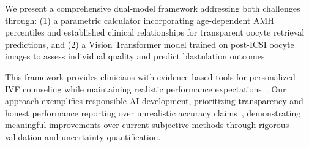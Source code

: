 We present a comprehensive dual-model framework addressing both challenges through: (1) a parametric calculator incorporating age-dependent AMH percentiles and established clinical relationships for transparent oocyte retrieval predictions, and (2) a Vision Transformer model trained on post-ICSI oocyte images to assess individual quality and predict blastulation outcomes.

This framework provides clinicians with evidence-based tools for personalized IVF counseling while maintaining realistic performance expectations~\cite{asrm2021counselors}. Our approach exemplifies responsible AI development, prioritizing transparency and honest performance reporting over unrealistic accuracy claims~\cite{varoquaux2022machine}, demonstrating meaningful improvements over current subjective methods through rigorous validation and uncertainty quantification. 